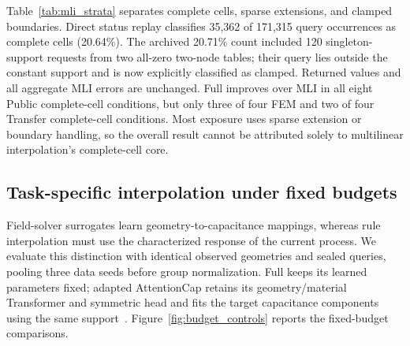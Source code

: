 \documentclass[conference,9pt,letterpaper]{IEEEtran}
\begin{document}
\begin{table}[t]
\centering\footnotesize\setlength{\tabcolsep}{5pt}
\caption{MLI status and support-region diagnostics. Queries count repeated
mask occurrences; errors average the available condition-level mean-mask
macro NRMSE within each stratum. Different strata have different coverage
and these means do not recombine by simple query-count weighting.}
\label{tab:mli_strata}
\end{table}
Table~\ref{tab:mli_strata} separates complete cells, sparse extensions,
and clamped boundaries. Direct status replay classifies 35,362 of 171,315
query occurrences as complete cells (20.64\%). The archived 20.71\%
count included 120 singleton-support requests from two all-zero two-node
tables; their query lies outside the constant support and is now explicitly
classified as clamped. Returned values and all aggregate MLI errors are
unchanged. Full improves over MLI in all eight Public complete-cell
conditions, but only three of four FEM and two of four Transfer complete-cell
conditions. Most exposure uses sparse extension or boundary handling, so
the overall result cannot be attributed solely to multilinear interpolation's
complete-cell core.

\subsection{Task-specific interpolation under fixed budgets}
\begin{table}[t]
\centering\footnotesize\setlength{\tabcolsep}{4pt}
\caption{Retained numerical controls at 30\% holdout, reaggregated from
their original records. Mean-mask macro NRMSE; the source-selected affine
control and fixed RBF-GP/PCHIP/IDW recipes retain their original definitions.
These are separate numerical methods, not an oracle chosen using target errors.}
\label{tab:numerical_thirty}
\end{table}
Field-solver surrogates learn geometry-to-capacitance mappings, whereas rule interpolation must use the characterized response of the current process. We evaluate this distinction with identical observed geometries and sealed queries, pooling three data seeds before group normalization. Full keeps its learned parameters fixed; adapted AttentionCap retains its geometry/material Transformer and symmetric head and fits the target capacitance components using the same support~\cite{attentioncap,attentioncode}. Figure~\ref{fig:budget_controls} reports the fixed-budget comparisons.
\end{document}

